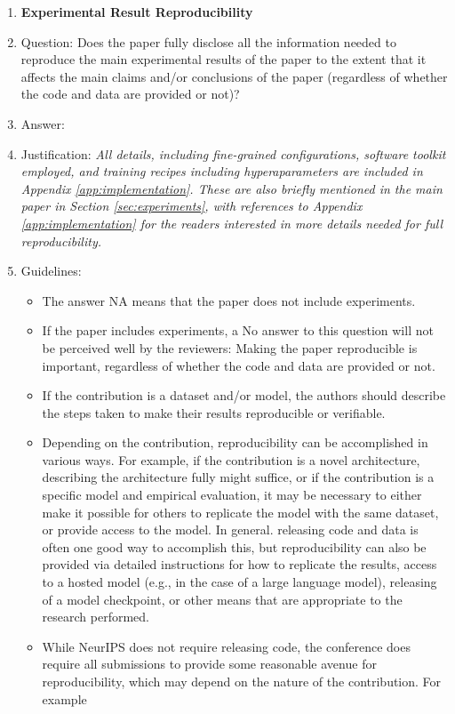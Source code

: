 \documentclass{article}
\theoremstyle{plain}
\begin{document}
\begin{enumerate}
    \item {\bf Experimental Result Reproducibility}
    \item[] Question: Does the paper fully disclose all the information needed to reproduce the main experimental results of the paper to the extent that it affects the main claims and/or conclusions of the paper (regardless of whether the code and data are provided or not)?
    \item[] Answer: \answerYes %
    \item[] Justification: \textit{All details, including fine-grained configurations, software toolkit employed, and training recipes including hyperaparameters are included in Appendix \ref{app:implementation}. These are also briefly mentioned in the main paper in Section \ref{sec:experiments}, with references to Appendix \ref{app:implementation} for the readers interested in more details needed for full reproducibility.}
    \item[] Guidelines:
    \begin{itemize}
        \item The answer NA means that the paper does not include experiments.
        \item If the paper includes experiments, a No answer to this question will not be perceived well by the reviewers: Making the paper reproducible is important, regardless of whether the code and data are provided or not.
        \item If the contribution is a dataset and/or model, the authors should describe the steps taken to make their results reproducible or verifiable. 
        \item Depending on the contribution, reproducibility can be accomplished in various ways. For example, if the contribution is a novel architecture, describing the architecture fully might suffice, or if the contribution is a specific model and empirical evaluation, it may be necessary to either make it possible for others to replicate the model with the same dataset, or provide access to the model. In general. releasing code and data is often one good way to accomplish this, but reproducibility can also be provided via detailed instructions for how to replicate the results, access to a hosted model (e.g., in the case of a large language model), releasing of a model checkpoint, or other means that are appropriate to the research performed.
        \item While NeurIPS does not require releasing code, the conference does require all submissions to provide some reasonable avenue for reproducibility, which may depend on the nature of the contribution. For example

\end{itemize}
\end{enumerate}
\end{document}
